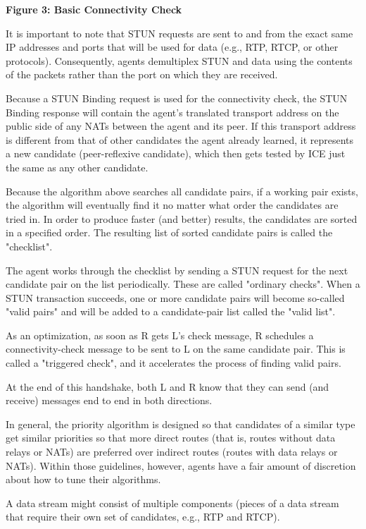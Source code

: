 \documentclass{article}
\begin{document}
\begin{center}
\textbf{Figure 3: Basic Connectivity Check}
\end{center}

It is important to note that STUN requests are sent to and from the exact same IP addresses and ports that will be used for data (e.g., RTP, RTCP, or other protocols).  Consequently, agents demultiplex STUN and data using the contents of the packets rather than the port on which they are received.

Because a STUN Binding request is used for the connectivity check, the STUN Binding response will contain the agent's translated transport address on the public side of any NATs between the agent and its peer.  If this transport address is different from that of other candidates the agent already learned, it represents a new candidate (peer-reflexive candidate), which then gets tested by ICE just the same as any other candidate.

Because the algorithm above searches all candidate pairs, if a working pair exists, the algorithm will eventually find it no matter what order the candidates are tried in.  In order to produce faster (and better) results, the candidates are sorted in a specified order. The resulting list of sorted candidate pairs is called the "checklist".

The agent works through the checklist by sending a STUN request for the next candidate pair on the list periodically.  These are called "ordinary checks".  When a STUN transaction succeeds, one or more candidate pairs will become so-called "valid pairs" and will be added to a candidate-pair list called the "valid list".

As an optimization, as soon as R gets L's check message, R schedules a connectivity-check message to be sent to L on the same candidate pair.  This is called a "triggered check", and it accelerates the process of finding valid pairs.

At the end of this handshake, both L and R know that they can send (and receive) messages end to end in both directions.

In general, the priority algorithm is designed so that candidates of a similar type get similar priorities so that more direct routes (that is, routes without data relays or NATs) are preferred over indirect routes (routes with data relays or NATs).  Within those guidelines, however, agents have a fair amount of discretion about how to tune their algorithms.

A data stream might consist of multiple components (pieces of a data stream that require their own set of candidates, e.g., RTP and RTCP).
\end{document}
